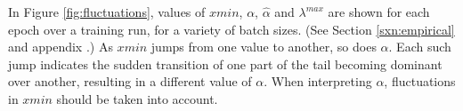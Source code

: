 In Figure \ref{fig:fluctuations}, values of $xmin$, $\alpha$, $\hat{\alpha}$ and $\lambda^{max}$ are shown for each 
epoch over a training run, for a variety of batch sizes. (See Section \ref{sxn:empirical} and appendix .) As 
$xmin$ jumps from one value to another, so does $\alpha$. Each such jump indicates the sudden transition of one part of 
the tail becoming dominant over another, resulting in a different value of $\alpha$. When interpreting $\alpha$, 
fluctuations in $xmin$ should be taken into account.



\begin{figure}[b] %
    \centering
\end{figure}
